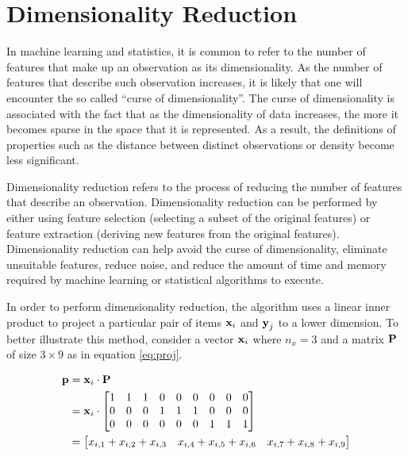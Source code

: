 \section{Dimensionality Reduction} \label{sect:theory:dim-reduction}
In machine learning and statistics, it is common to refer to the number of features that make up an observation as its dimensionality. As the number of features that describe such observation increases, it is likely that one will encounter the so called ``curse of dimensionality''. The curse of dimensionality is associated with the fact that as the dimensionality of data increases, the more it becomes sparse in the space that it is represented. As a result, the definitions of properties such as the distance between distinct observations or density become less significant. \newline

Dimensionality reduction refers to the process of reducing the number of features that describe an observation. Dimensionality reduction can be performed by either using feature selection (selecting a subset of the original features) or feature extraction (deriving new features from the original features). Dimensionality reduction can help avoid the curse of dimensionality, eliminate unsuitable features, reduce noise, and reduce the amount of time and memory required by machine learning or statistical algorithms to execute. \newline

In order to perform dimensionality reduction, the \mlblink algorithm uses a linear inner product to project a particular pair of items $\boldsymbol{\mathbf{x}}_i$ and $\boldsymbol{\mathbf{y}}_j$ to a lower dimension. To better illustrate this method, consider a vector $\boldsymbol{\mathbf{x}}_i$ where $n_x=3$ and a matrix $\boldsymbol{\mathbf{P}}$ of size $3 \times 9$ as in equation \ref{eq:proj}.

\begin{equation} \label{eq:proj}
    \begin{split}
        \boldsymbol{\mathbf{p}} 
        &= 
            \boldsymbol{\mathbf{x}}_{i} \cdot \boldsymbol{\mathbf{P}} \\
        &=
            \boldsymbol{\mathbf{x}}_{i} \cdot
            \begin{bmatrix}
                1 & 1 & 1 & 0 & 0 & 0 & 0 & 0 & 0 \\
                0 & 0 & 0 & 1 & 1 & 1 & 0 & 0 & 0 \\
                0 & 0 & 0 & 0 & 0 & 0 & 1 & 1 & 1 \\
            \end{bmatrix} \\  
        &=
            \begin{bmatrix}
                x_{i,1} + x_{i,2} + x_{i,3} & x_{i,4} + x_{i,5} + x_{i,6} & x_{i,7} + x_{i,8} + x_{i,9}
            \end{bmatrix} \\
    \end{split}
\end{equation}

